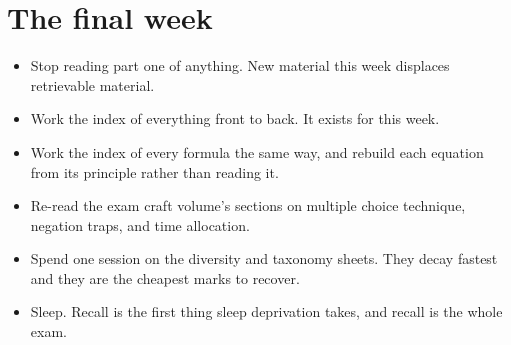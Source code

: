 \section{The final week}

\begin{keybox}[title={What to do and what to stop doing}]
\begin{itemize}
\item Stop reading part one of anything. New material this week displaces retrievable
      material.
\item Work the index of everything front to back. It exists for this week.
\item Work the index of every formula the same way, and rebuild each equation from its
      principle rather than reading it.
\item Re-read the exam craft volume's sections on multiple choice technique, negation
      traps, and time allocation.
\item Spend one session on the diversity and taxonomy sheets. They decay fastest and
      they are the cheapest marks to recover.
\item Sleep. Recall is the first thing sleep deprivation takes, and recall is the whole
      exam.
\end{itemize}
\end{keybox}

